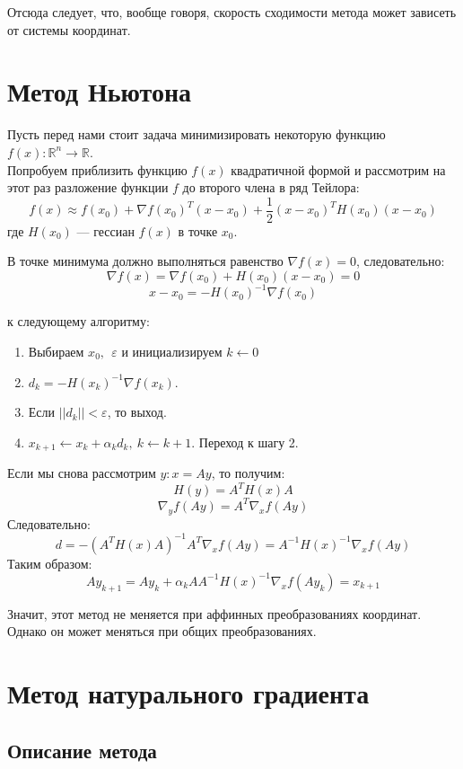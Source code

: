 \documentclass[a4paper,12pt]{article}
\begin{document}
Отсюда следует, что, вообще говоря, скорость сходимости метода может зависеть от системы координат. \\

\newpage


\section{Метод Ньютона}
Пусть перед нами стоит задача минимизировать некоторую функцию $f(x) : \mathbb{R}^{n} \rightarrow \mathbb{R}$. \\
Попробуем приблизить функцию $f(x)$ квадратичной формой и рассмотрим на этот раз разложение функции $f$ до второго члена в ряд Тейлора:
$$f(x) \approx f(x_0) + \nabla{f(x_0)}^T(x - x_0) + \frac{1}{2}(x - x_0)^TH(x_0)(x - x_0)$$
где $H(x_0)$ --- гессиан $f(x)$ в точке $x_0$.

В точке минимума должно выполняться равенство $\nabla{f(x)} = 0$, следовательно:
$$\nabla{f(x)} = \nabla{f(x_0)} + H(x_0)(x - x_0) = 0$$
$$x - x_0 = -H(x_0)^{-1}\nabla{f(x_0)}$$

 к следующему алгоритму:
\begin{enumerate}
    \item Выбираем $x_0, ~~ \varepsilon $ и инициализируем $k \leftarrow 0$
    \item $d_k = -H(x_k)^{-1}\nabla{f(x_k)}$.
    \item Если $||d_k|| < \varepsilon$, то выход.
    \item $x_{k+1} \leftarrow x_{k} + \alpha_k d_k, ~ k \leftarrow k + 1$. Переход к шагу 2. 
\end{enumerate}

Если мы снова рассмотрим $y: x = Ay$, то получим:
$$H(y) = A^TH(x)A$$
$$\nabla_y{f(Ay)} = A^T \nabla_x{f(Ay)}$$
Следовательно:
$$d = -(A^TH(x)A)^{-1} A^T \nabla_x{f(Ay)} = A^{-1}H(x)^{-1} \nabla_x{f(Ay)} $$
Таким образом: 
$$Ay_{k+1} = Ay_{k} + \alpha_k AA^{-1}H(x)^{-1} \nabla_x{f(Ay_k)} = x_{k+1}$$

Значит, этот метод не меняется при аффинных преобразованиях координат. Однако он может меняться при общих преобразованиях.
\newpage

\section{Метод натурального градиента}
\subsection{Описание метода}
\end{document}
